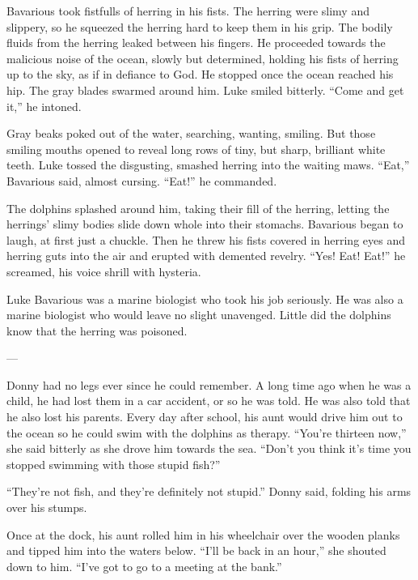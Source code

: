 Bavarious took fistfulls of herring in his fists. The herring were
slimy and slippery, so he squeezed the herring hard to keep them in
his grip. The bodily fluids from the herring leaked between his
fingers. He proceeded towards the malicious noise of the ocean,
slowly but determined, holding his fists of herring up to the sky,
as if in defiance to God. He stopped once the ocean reached his
hip. The gray blades swarmed around him. Luke smiled bitterly.
``Come and get it,'' he intoned.



Gray beaks poked out of the water, searching, wanting, smiling. But
those smiling mouths opened to reveal long rows of tiny, but sharp,
brilliant white teeth. Luke tossed the disgusting, smashed herring
into the waiting maws. ``Eat,'' Bavarious said, almost cursing.
``Eat!'' he commanded.



The dolphins splashed around him, taking their fill of the herring,
letting the herrings' slimy bodies slide down whole into their
stomachs. Bavarious began to laugh, at first just a chuckle. Then
he threw his fists covered in herring eyes and herring guts into
the air and erupted with demented revelry. ``Yes! Eat! Eat!'' he
screamed, his voice shrill with hysteria.



Luke Bavarious was a marine biologist who took his job seriously.
He was also a marine biologist who would leave no slight unavenged.
Little did the dolphins know that the herring was poisoned.



---



Donny had no legs ever since he could remember. A long time ago
when he was a child, he had lost them in a car accident, or so he
was told. He was also told that he also lost his parents. Every day
after school, his aunt would drive him out to the ocean so he could
swim with the dolphins as therapy. ``You're thirteen now,'' she said
bitterly as she drove him towards the sea. ``Don't you think it's
time you stopped swimming with those stupid fish?''



``They're not fish, and they're definitely not stupid.'' Donny said,
folding his arms over his stumps.



Once at the dock, his aunt rolled him in his wheelchair over the
wooden planks and tipped him into the waters below. ``I'll be back
in an hour,'' she shouted down to him. ``I've got to go to a meeting
at the bank.''



